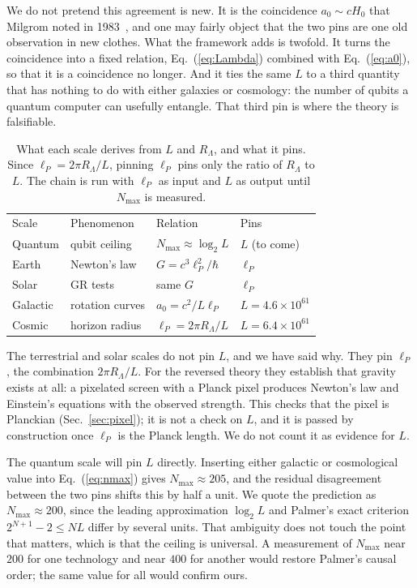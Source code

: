 \documentclass[aps,prd,twocolumn,superscriptaddress,nofootinbib,showkeys]{revtex4-2}
\begin{document}
We do not pretend this agreement is new. It is the coincidence $a_0\sim cH_0$ that Milgrom noted in 1983~\cite{milgrom1983}, and one may fairly object that the two pins are one old observation in new clothes. What the framework adds is twofold. It turns the coincidence into a fixed relation, Eq.~(\ref{eq:Lambda}) combined with Eq.~(\ref{eq:a0}), so that it is a coincidence no longer. And it ties the same $L$ to a third quantity that has nothing to do with either galaxies or cosmology: the number of qubits a quantum computer can usefully entangle. That third pin is where the theory is falsifiable.

\begin{table}[t]
\caption{What each scale derives from $L$ and $R_\Lambda$, and what it pins. Since $\ell_P = 2\pi R_\Lambda/L$, pinning $\ell_P$ pins only the ratio of $R_\Lambda$ to $L$. The chain is run with $\ell_P$ as input and $L$ as output until $N_{\max}$ is measured.}
\label{tab:pins}
\begin{ruledtabular}
\small\setlength{\tabcolsep}{2pt}
\begin{tabular}{llll}
Scale & Phenomenon & Relation & Pins \\
\colrule
Quantum & qubit ceiling & $N_{\max}\approx\log_2L$ & $L$ (to come) \\
Earth & Newton's law & $G=c^3\ell_P^2/\hbar$ & $\ell_P$ \\
Solar & GR tests & same $G$ & $\ell_P$ \\
Galactic & rotation curves & $a_0=c^2/L\ell_P$ & $L=4.6\!\times\!10^{61}$ \\
Cosmic & horizon radius & $\ell_P=2\pi R_\Lambda/L$ & $L=6.4\!\times\!10^{61}$ \\
\end{tabular}
\end{ruledtabular}
\end{table}

The terrestrial and solar scales do not pin $L$, and we have said why. They pin $\ell_P$, the combination $2\pi R_\Lambda/L$. For the reversed theory they establish that gravity exists at all: a pixelated screen with a Planck pixel produces Newton's law and Einstein's equations with the observed strength. This checks that the pixel is Planckian (Sec.~\ref{sec:pixel}); it is not a check on $L$, and it is passed by construction once $\ell_P$ is the Planck length. We do not count it as evidence for $L$.

The quantum scale will pin $L$ directly. Inserting either galactic or cosmological value into Eq.~(\ref{eq:nmax}) gives $N_{\max}\approx205$, and the residual disagreement between the two pins shifts this by half a unit. We quote the prediction as $N_{\max}\approx200$, since the leading approximation $\log_2L$ and Palmer's exact criterion $2^{N+1}-2\le NL$ differ by several units. That ambiguity does not touch the point that matters, which is that the ceiling is universal. A measurement of $N_{\max}$ near $200$ for one technology and near $400$ for another would restore Palmer's causal order; the same value for all would confirm ours.
\end{document}
